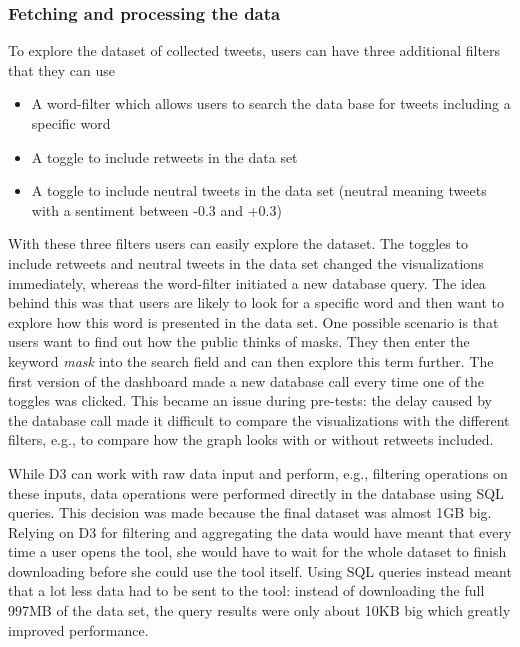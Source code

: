 \subsubsection{Fetching and processing the data}
To explore the dataset of collected tweets, users can have three additional filters that they can use
\begin{itemize}
    \item A word-filter which allows users to search the data base for tweets including a specific word
    \item A toggle to include retweets in the data set
    \item A toggle to include neutral tweets in the data set (neutral meaning tweets with a sentiment between -0.3 and +0.3)
\end{itemize}
With these three filters users can easily explore the dataset. The toggles to include retweets and neutral tweets in the data set changed the visualizations immediately, whereas the word-filter initiated a new database query. The idea behind this was that users are likely to look for a specific word and then want to explore how this word is presented in the data set. One possible scenario is that users want to find out how the public thinks of masks. They then enter the keyword \emph{mask} into the search field and can then explore this term further. The first version of the dashboard made a new database call every time one of the toggles was clicked. This became an issue during pre-tests: the delay caused by the database call made it difficult to compare the visualizations with the different filters, e.g., to compare how the graph looks with or without retweets included.

While D3 can work with raw data input and perform, e.g., filtering operations on these inputs, data operations were performed directly in the database using SQL queries. This decision was made because the final dataset was almost 1GB big. Relying on D3 for filtering and aggregating the data would have meant that every time a user opens the tool, she would have to wait for the whole dataset to finish downloading before she could use the tool itself. Using SQL queries instead meant that a lot less data had to be sent to the tool: instead of downloading the full 997MB of the data set, the query results were only about 10KB big which greatly improved performance.

